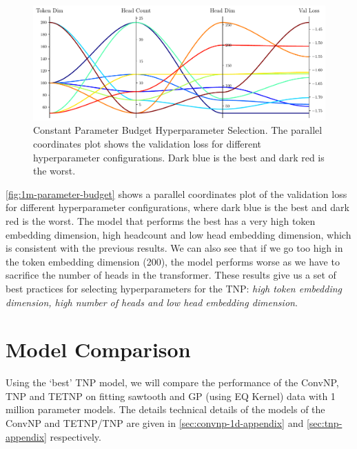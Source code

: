 \documentclass[../../main.tex]{subfiles}
\begin{document}

\FloatBarrier
\begin{figure}[ht!]
	\centering
	\includegraphics[width=0.9\linewidth]{./model-comparsion-1d.pdf}
	\caption{Constant Parameter Budget Hyperparameter Selection. The parallel coordinates plot shows the validation loss for different hyperparameter configurations. Dark blue is the best and dark red is the worst.}
	\label{fig:1m-parameter-budget}
\end{figure}
\FloatBarrier

\autoref{fig:1m-parameter-budget} shows a parallel coordinates plot of the validation loss for different hyperparameter configurations, where dark blue is the best and dark red is the worst. The model that performs the best has a very high token embedding dimension, high headcount and low head embedding dimension, which is consistent with the previous results. We can also see that if we go too high in the token embedding dimension (200), the model performs worse as we have to sacrifice the number of heads in the transformer. These results give us a set of best practices for selecting hyperparameters for the TNP: \emph{high token embedding dimension, high number of heads and low head embedding dimension}.





\section{Model Comparison}


Using the `best' TNP model, we will compare the performance of the ConvNP, TNP and TETNP on fitting sawtooth and GP (using EQ Kernel) data with 1 million parameter models. The details technical details of the models of the ConvNP and TETNP/TNP are given in \autoref{sec:convnp-1d-appendix} and \autoref{sec:tnp-appendix} respectively.
\end{document}
